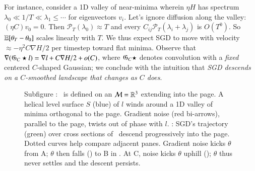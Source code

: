 For instance, consider a 1D valley of near-minima wherein $\eta H$ has spectrum
$\lambda_0 \ll 1/T \ll \lambda_1 \leq \cdots$ for eigenvectors
$v_i$.  Let's ignore diffusion along the valley: $(\eta C) v_0 =
0$.
%
Then ${\mathcal P}_T(\lambda_0)\approx T$ and every
$C_{ij}{\mathcal P}_T(\lambda_i+\lambda_j)$ is $O(T^0)$.  So $\mathbb{E}[\theta_T-\theta_0]$
scales linearly with $T$.  We thus expect SGD to move with
velocity $\approx -\eta^2 C\nabla H/2$ per timestep toward flat minima.  
Observe that $\nabla ({\frak G}_C \star l) = \nabla l+C\nabla
H/2 + o(C)$, where ${\frak G}_C \star$ denotes convolution with a
\emph{fixed} centered $C$-shaped Gaussian; we conclude with the
intuition that \emph{SGD descends on a $C$-smoothed landscape that
changes as $C$ does}.  %

\begin{figure}[h!]
    \hspace{-0.04cm}
    \squash
    \caption{%
        Subfigure {\!\!\protect{}}: \Helix\ is defined on an $\mathcal{M}=\mathbb{R}^3$ 
        extending into the page.  A helical
        level surface $S$ (blue) of $l$ winds around 
        a 1D valley of minima orthogonal to the
        page.
        Gradient noise (red bi-arrows),
        parallel to the page, twists out of phase with $l$.
        {\protect{}}: SGD's trajectory (green) over 
        cross sections of \Helix\ descend progressively
        into the page.
        Dotted
        curves help compare adjacent panes.
        Gradient noise kicks $\theta$ from A; $\theta$ then falls
        ({\!\!\protect{}}) to B in
        {\protect{}}.  At C, noise kicks $\theta$
        uphill (\!\!\protect{}); $\theta$ thus never
        settles and the descent persists.
    }
    \squash\squash
    \label{fig:archimedes}
\end{figure}

